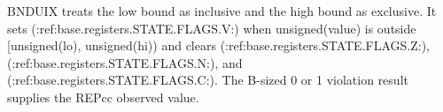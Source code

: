 BNDUIX treats the low bound as inclusive and the high bound as exclusive. It sets (:ref:base.registers.STATE.FLAGS.V:) when unsigned(value) is outside [unsigned(lo), unsigned(hi)) and clears (:ref:base.registers.STATE.FLAGS.Z:), (:ref:base.registers.STATE.FLAGS.N:), and (:ref:base.registers.STATE.FLAGS.C:). The B-sized 0 or 1 violation result supplies the REPcc observed value.

